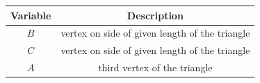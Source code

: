 \begin{tabular}[12pt]{ |c| c|}
    \hline
    \textbf{Variable} & \textbf{Description}\\ 
    \hline
    $B$ & vertex on side of given length of the triangle\\
    \hline 
    $C$ & vertex on side of given length of the triangle\\
    \hline
    $A$ & third vertex of the triangle\\
    \hline
    
   
     
    \end{tabular}